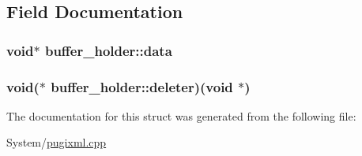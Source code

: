 \subsection{Field Documentation}
\hypertarget{structbuffer__holder_a06c1e1004fac90848dfdb4fbc150cede}{
\subsubsection[{data}]{\setlength{\rightskip}{0pt plus 5cm}void$\ast$ buffer\-\_\-holder\-::data}}\label{structbuffer__holder_a06c1e1004fac90848dfdb4fbc150cede}
\hypertarget{structbuffer__holder_a96e7067c68bc1f7a9ee7dd75c84f04e8}{
\subsubsection[{deleter}]{\setlength{\rightskip}{0pt plus 5cm}void($\ast$ buffer\-\_\-holder\-::deleter)(void $\ast$)}}\label{structbuffer__holder_a96e7067c68bc1f7a9ee7dd75c84f04e8}


The documentation for this struct was generated from the following file\-:\begin{DoxyCompactItemize}
\item 
System/\hyperlink{pugixml_8cpp}{pugixml.\-cpp}\end{DoxyCompactItemize}
